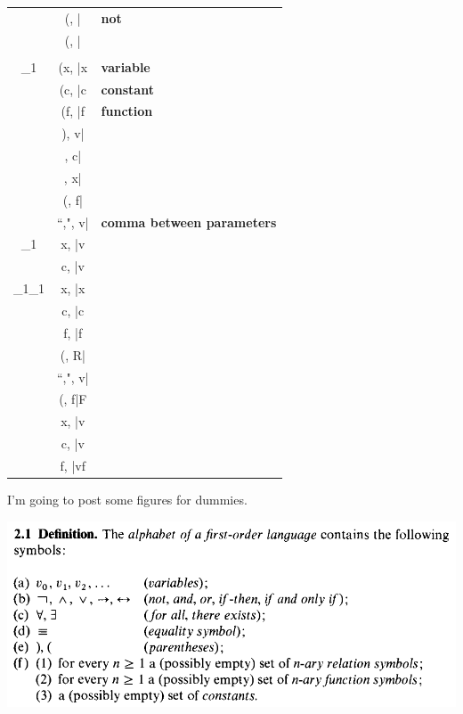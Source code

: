 \documentclass[10pt,a4paper]{article}
\begin{document}
		\begin{tabular}{|C|C|L}
		  \lambda\rho & (\urcorner, \lambda|\varphi & \textbf{not} \\
		   & (, \lambda|\psi  \\
		   & \lambda  \\
		  \rho\beta_1 & (x, \lambda|x & \textbf{variable} \\
		   & (c, \lambda|c & \textbf{constant}  \\
		   & (f, \lambda|f & \textbf{function} \\
		  \delta\eta & ), v|\lambda \\
		   & \lambda, c|\lambda \\
		   & \lambda, x|\lambda \\
		  \cline{1-2}
		  \delta\zeta & (, f|\lambda \\
		  & ``,", v|\lambda & \textbf{comma between parameters} \\
		  \zeta\beta_1 & x, \lambda|v \\
		  & c, \lambda|v \\
		  \alpha_1\beta_1 & x, \lambda|x \\
		   & c, \lambda|c  \\
		   & f, \lambda|f \\
		  \nu\xi & (, R|\lambda \\
		  & ``,", v|\lambda \\
		  & (, f|F \\
		  \xi\kappa & x, \lambda|v \\
		   & c, \lambda|v \\
		    & f, \lambda|vf \\
		\end{tabular}

		\vspace{120mm}

		I'm going to post some figures for dummies.

		\begin{center}
		\includegraphics[scale=.5]{21}
		\end{center}
\end{document}
